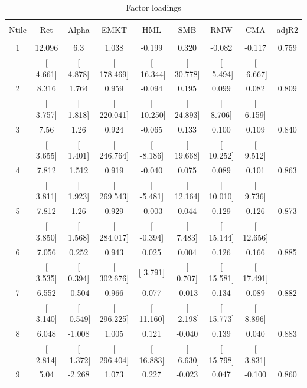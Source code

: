 \documentclass[16pt]{article}
\begin{document}
\begin{table}[!htbp] \centering 
  \caption{Factor loadings} 
  \label{} 
\begin{tabular}{@{\extracolsep{5pt}} ccccccccc} 
\\[-1.8ex]\hline 
\hline \\[-1.8ex] 
Ntile & Ret & Alpha & EMKT & HML & SMB & RMW & CMA & adjR2 \\ 
\hline \\[-1.8ex] 
1 & 12.096 & 6.3 & 1.038 & -0.199 & 0.320 & -0.082 & -0.117 & 0.759 \\ 
 & [ 4.661] & [ 4.878] & [ 178.469] & [ -16.344] & [ 30.778] & [ -5.494] & [ -6.667] &  \\ 
2 & 8.316 & 1.764 & 0.959 & -0.094 & 0.195 & 0.099 & 0.082 & 0.809 \\ 
 & [ 3.757] & [ 1.818] & [ 220.041] & [ -10.250] & [ 24.893] & [ 8.706] & [ 6.159] &  \\ 
3 & 7.56 & 1.26 & 0.924 & -0.065 & 0.133 & 0.100 & 0.109 & 0.840 \\ 
 & [ 3.655] & [ 1.401] & [ 246.764] & [ -8.186] & [ 19.668] & [ 10.252] & [ 9.512] &  \\ 
4 & 7.812 & 1.512 & 0.919 & -0.040 & 0.075 & 0.089 & 0.101 & 0.863 \\ 
 & [ 3.811] & [ 1.923] & [ 269.543] & [ -5.481] & [ 12.164] & [ 10.010] & [ 9.736] &  \\ 
5 & 7.812 & 1.26 & 0.929 & -0.003 & 0.044 & 0.129 & 0.126 & 0.873 \\ 
 & [ 3.850] & [ 1.568] & [ 284.017] & [ -0.394] & [ 7.483] & [ 15.144] & [ 12.656] &  \\ 
6 & 7.056 & 0.252 & 0.943 & 0.025 & 0.004 & 0.126 & 0.166 & 0.885 \\ 
 & [ 3.535] & [ 0.394] & [ 302.676] & [ 3.791] & [ 0.707] & [ 15.581] & [ 17.491] &  \\ 
7 & 6.552 & -0.504 & 0.966 & 0.077 & -0.013 & 0.134 & 0.089 & 0.882 \\ 
 & [ 3.140] & [ -0.549] & [ 296.225] & [ 11.160] & [ -2.198] & [ 15.773] & [ 8.896] &  \\ 
8 & 6.048 & -1.008 & 1.005 & 0.121 & -0.040 & 0.139 & 0.040 & 0.883 \\ 
 & [ 2.814] & [ -1.372] & [ 296.404] & [ 16.883] & [ -6.630] & [ 15.798] & [ 3.831] &  \\ 
9 & 5.04 & -2.268 & 1.073 & 0.227 & -0.023 & 0.047 & -0.100 & 0.860 \\ 

\end{tabular}
\end{table}
\end{document}

